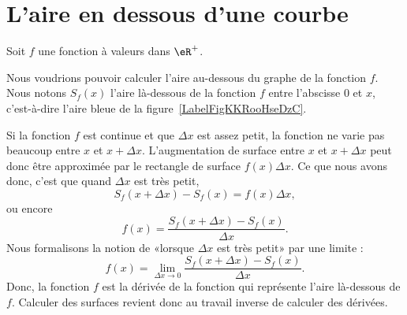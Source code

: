 
\section{L'aire en dessous d'une courbe}

Soit \( f\) une fonction à valeurs dans \( \eR^+\).

Nous voudrions pouvoir calculer l'aire au-dessous du graphe de la fonction \( f\). Nous notons \( S_f(x)\) l'aire là-dessous de la fonction \( f\) entre l'abscisse \( 0\) et \( x\), c'est-à-dire l'aire bleue de la figure~\ref{LabelFigKKRooHseDzC}.

\newcommand{\CaptionFigKKRooHseDzC}{L'aire en dessous d'une courbe. Le rectangle rouge d'aire \( f(x)\Delta x\) approxime de combien la surface augmente lorsqu'on passe de \( x\) à \( x+\Delta x\).}


Si la fonction \( f\) est continue et que \( \Delta x\) est assez petit, la fonction ne varie pas beaucoup entre \( x\) et \( x+\Delta x\). L'augmentation de surface entre \( x\) et \( x+\Delta x\) peut donc être approximée par le rectangle de surface \( f(x)\Delta x\). Ce que nous avons donc, c'est que quand \( \Delta x\) est très petit,
\begin{equation}
	S_f(x+\Delta x)-S_f(x)=f(x)\Delta x,
\end{equation}
ou encore
\begin{equation}
	f(x)=\frac{  S_f(x+\Delta x)-S_f(x)}{ \Delta x }.
\end{equation}
Nous formalisons la notion de «lorsque \( \Delta x\) est très petit» par une limite :
\begin{equation}
	f(x)=\lim_{\Delta x\to 0}\frac{  S_f(x+\Delta x)-S_f(x)}{ \Delta x }.
\end{equation}
Donc, la fonction \( f\) est la dérivée de la fonction qui représente l'aire là-dessous de \( f\). Calculer des surfaces revient donc au travail inverse de calculer des dérivées.

